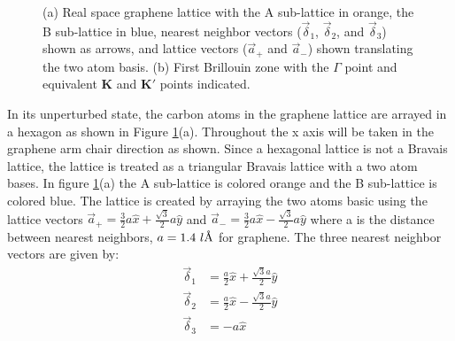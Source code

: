 \begin{figure}
\begin{center}
\end{center}
\caption{\label{fig:geometry} (a) Real space graphene lattice with the A sub-lattice in orange, the B sub-lattice in blue, nearest neighbor vectors ($\vec \delta_1$, $\vec \delta_2$, and $\vec \delta_3$) shown as arrows, and lattice vectors ($\vec a_+$ and $\vec a_-$) shown translating the two atom basis. (b) First Brillouin zone with the $\Gamma$ point and equivalent $\bm{K}$ and $\bm{K'}$ points indicated.}
\end{figure}

In its unperturbed state, the carbon atoms in the graphene lattice are arrayed in a hexagon as shown in Figure \ref{fig:geometry}(a).  Throughout the x axis will be taken in the graphene arm chair direction as shown.  Since a hexagonal lattice is not a Bravais lattice, the lattice is treated as a triangular Bravais lattice with a two atom bases.  In figure \ref{fig:geometry}(a) the A sub-lattice is colored orange and the B sub-lattice is colored blue.  The lattice is created by arraying the two atoms basic using the lattice vectors $\vec{a}_+=\frac{3}{2} a \hat{x}+\frac{\sqrt{3}}{2} a \hat{y}$ and $\vec{a}_-=\frac{3}{2} a \hat{x}-\frac{\sqrt{3}}{2} a \hat{y}$ where a is the distance between nearest neighbors, $a=1.4 \ l\textup{\AA}$ for graphene.  The three nearest neighbor vectors are given by:
\begin{align*}
	\vec \delta_1&=\frac{a}{2}\hat{x}+\frac{\sqrt{3} a}{2}\hat{y}\\
	\vec \delta_2&=\frac{a}{2}\hat{x}-\frac{\sqrt{3} a}{2}\hat{y}\\
	\vec \delta_3&=-a \hat{x}
\end{align*}

